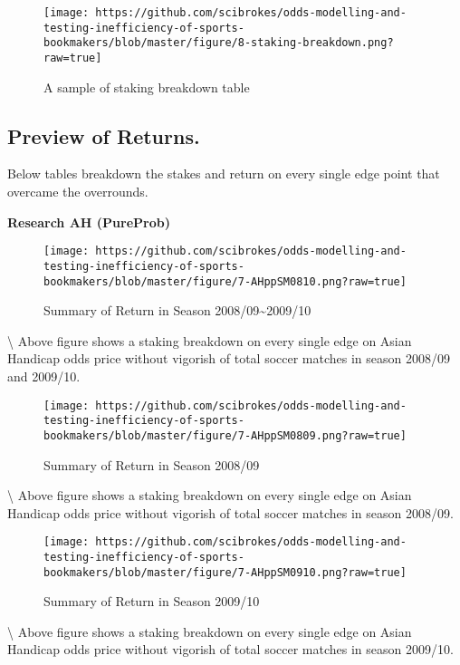 \documentclass[article]{jss}
\begin{document}
\begin{figure}[htbp]
\centering
\texttt{[image: https://github.com/scibrokes/odds-modelling-and-testing-inefficiency-of-sports-bookmakers/blob/master/figure/8-staking-breakdown.png?raw=true]}
\caption{A sample of staking breakdown table}
\end{figure}

\subsection{Preview of Returns.}\label{preview-of-returns.}

Below tables breakdown the stakes and return on every single edge point
that overcame the overrounds. \bigbreak

\textbf{Research AH (PureProb)} \bigbreak

\begin{figure}[htbp]
\centering
\texttt{[image: https://github.com/scibrokes/odds-modelling-and-testing-inefficiency-of-sports-bookmakers/blob/master/figure/7-AHppSM0810.png?raw=true]}
\caption{Summary of Return in Season 2008/09\textasciitilde{}2009/10}
\end{figure}

\textbackslash{} Above figure shows a staking breakdown on every single
edge on Asian Handicap odds price without vigorish of total soccer
matches in season 2008/09 and 2009/10.

\begin{figure}[htbp]
\centering
\texttt{[image: https://github.com/scibrokes/odds-modelling-and-testing-inefficiency-of-sports-bookmakers/blob/master/figure/7-AHppSM0809.png?raw=true]}
\caption{Summary of Return in Season 2008/09}
\end{figure}

\textbackslash{} Above figure shows a staking breakdown on every single
edge on Asian Handicap odds price without vigorish of total soccer
matches in season 2008/09.

\begin{figure}[htbp]
\centering
\texttt{[image: https://github.com/scibrokes/odds-modelling-and-testing-inefficiency-of-sports-bookmakers/blob/master/figure/7-AHppSM0910.png?raw=true]}
\caption{Summary of Return in Season 2009/10}
\end{figure}

\textbackslash{} Above figure shows a staking breakdown on every single
edge on Asian Handicap odds price without vigorish of total soccer
matches in season 2009/10. \bigbreak
\end{document}
